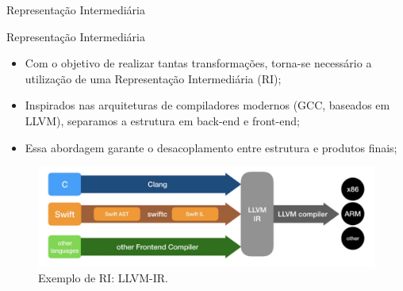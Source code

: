 \begin{chapter}{}{Representação Intermediária}
\end{chapter}

\begin{frame}{Representação Intermediária}
    \begin{itemize}
        \item Com o objetivo de realizar tantas transformações, torna-se necessário a utilização de uma Representação Intermediária (RI);

        \item Inspirados nas arquiteturas de compiladores modernos (GCC, baseados em LLVM), separamos a estrutura em back-end e front-end;

        \item Essa abordagem garante o desacoplamento entre estrutura e produtos finais;
    \end{itemize}

    \begin{figure}
        \centering
        \includegraphics[height=\textheight, width=\textwidth, keepaspectratio=true]{beamerthemesrc/images/llvm-ir.png}
        \caption{Exemplo de RI: LLVM-IR.}
    \end{figure}
\end{frame}

